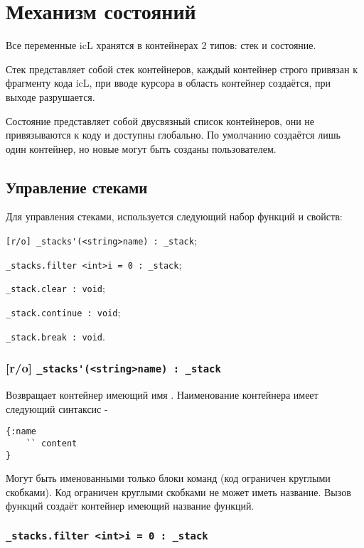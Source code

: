 \section{Механизм состояний}

Все переменные icL хранятся в контейнерах 2 типов: стек и состояние.

Стек представляет собой стек контейнеров, каждый контейнер строго привязан к фрагменту кода icL, при вводе курсора в область контейнер создаётся, при выходе разрушается.

Состояние представляет собой двусвязный список контейнеров, они не привязываются к коду и доступны глобально. По умолчанию создаётся лишь один контейнер, но новые могут быть созданы пользователем.

\subsection{Управление стеками}

Для управления стеками, используется следующий набор функций и свойств:
\begin{icItems}
	\item \lstinline|[r/o] _stacks'(<string>name) : _stack|;
	\item \lstinline|_stacks.filter <int>i = 0 : _stack|;
	\item \lstinline|_stack.clear : void|;
	\item \lstinline|_stack.continue : void|;
	\item \lstinline|_stack.break : void|.
\end{icItems}

\subsubsection{[r/o] \lstinline|_stacks'(<string>name) : _stack|}

Возвращает контейнер имеющий имя . Наименование контейнера имеет следующий синтаксис -
\begin{lstlisting}[numbers=none]
{:name
	`` content
}
\end{lstlisting}
Могут быть именованными только блоки команд (код ограничен круглыми скобками). Код ограничен круглыми скобками не может иметь название. Вызов функций создаёт контейнер имеющий название функций.

\subsubsection{\lstinline|_stacks.filter <int>i = 0 : _stack|}

